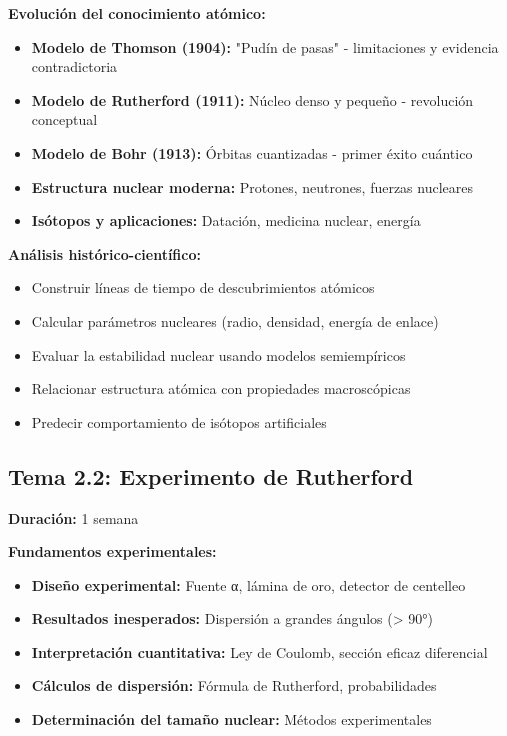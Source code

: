 \begin{tecnologiabox}
\begin{tecnologiabox}
\begin{tecnologiabox}
\begin{teknologiabox}
\begin{saberbox}
\textbf{Evolución del conocimiento atómico:}
\begin{itemize}
\item \textbf{Modelo de Thomson (1904):} "Pudín de pasas" - limitaciones y evidencia contradictoria
\item \textbf{Modelo de Rutherford (1911):} Núcleo denso y pequeño - revolución conceptual
\item \textbf{Modelo de Bohr (1913):} Órbitas cuantizadas - primer éxito cuántico
\item \textbf{Estructura nuclear moderna:} Protones, neutrones, fuerzas nucleares
\item \textbf{Isótopos y aplicaciones:} Datación, medicina nuclear, energía
\end{itemize}
\end{saberbox}

\begin{saberhacerbox}
\textbf{Análisis histórico-científico:}
\begin{itemize}
\item Construir líneas de tiempo de descubrimientos atómicos
\item Calcular parámetros nucleares (radio, densidad, energía de enlace)
\item Evaluar la estabilidad nuclear usando modelos semiempíricos
\item Relacionar estructura atómica con propiedades macroscópicas
\item Predecir comportamiento de isótopos artificiales
\end{itemize}
\end{saberhacerbox}

\subsection{Tema 2.2: Experimento de Rutherford}
\textbf{Duración:} 1 semana

\begin{saberbox}
\textbf{Fundamentos experimentales:}
\begin{itemize}
\item \textbf{Diseño experimental:} Fuente α, lámina de oro, detector de centelleo
\item \textbf{Resultados inesperados:} Dispersión a grandes ángulos (> 90°)
\item \textbf{Interpretación cuantitativa:} Ley de Coulomb, sección eficaz diferencial
\item \textbf{Cálculos de dispersión:} Fórmula de Rutherford, probabilidades
\item \textbf{Determinación del tamaño nuclear:} Métodos experimentales
\end{itemize}
\end{saberbox}


\end{teknologiabox}
\end{tecnologiabox}
\end{tecnologiabox}
\end{tecnologiabox}
